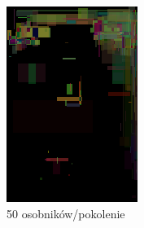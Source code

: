 \begin{figure}[!htb]
\begin{subfigure}[b]{0.3\textwidth}
         \includegraphics[width=\textwidth]{images/mona/10000_50_2/img_0_it_1000_best.png}
         \caption{50 osobników/pokolenie}
    \end{subfigure}
     \begin{subfigure}[b]{0.3\textwidth}
        \centering

\end{subfigure}
\end{figure}
